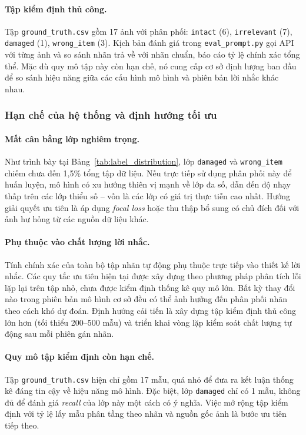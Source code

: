 \paragraph{Tập kiểm định thủ công.}
Tập \texttt{ground\_truth.csv} gồm 17 ảnh với phân phối: \texttt{intact} (6),
\texttt{irrelevant} (7), \texttt{damaged} (1), \texttt{wrong\_item} (3). Kịch bản
đánh giá trong \texttt{eval\_prompt.py} gọi API với từng ảnh và so sánh nhãn trả về
với nhãn chuẩn, báo cáo tỷ lệ chính xác tổng thể. Mặc dù quy mô tập này còn hạn chế,
nó cung cấp cơ sở định lượng ban đầu để so sánh hiệu năng giữa các cấu hình mô hình
và phiên bản lời nhắc khác nhau.



\subsubsection{Hạn chế của hệ thống và định hướng tối ưu}

\paragraph{Mất cân bằng lớp nghiêm trọng.}
Như trình bày tại Bảng~\ref{tab:label_distribution}, lớp \texttt{damaged} và
\texttt{wrong\_item} chiếm chưa đến 1,5\% tổng tập dữ liệu. Nếu trực tiếp sử dụng
phân phối này để huấn luyện, mô hình có xu hướng thiên vị mạnh
về lớp đa số, dẫn đến độ nhạy thấp trên các lớp thiểu số -- vốn là
các lớp có giá trị thực tiễn cao nhất. Hướng giải quyết ưu tiên là áp dụng
\textit{focal loss} hoặc thu thập bổ sung có chủ đích
đối với ảnh hư hỏng từ các nguồn dữ liệu khác.

\paragraph{Phụ thuộc vào chất lượng lời nhắc.}
Tính chính xác của toàn bộ tập nhãn tự động phụ thuộc trực tiếp vào thiết kế lời
nhắc. Các quy tắc ưu tiên hiện tại được xây dựng theo phương pháp phân tích lỗi lặp
lại trên tập nhỏ, chưa được kiểm định thống kê
quy mô lớn. Bất kỳ thay đổi nào trong phiên bản mô hình cơ sở đều có thể ảnh hưởng
đến phân phối nhãn theo cách khó dự đoán. Định hướng cải tiến là xây dựng tập kiểm
định thủ công lớn hơn (tối thiểu 200--500 mẫu) và triển khai vòng lặp kiểm soát
chất lượng tự động sau mỗi phiên gán nhãn.

\paragraph{Quy mô tập kiểm định còn hạn chế.}
Tập \texttt{ground\_truth.csv} hiện chỉ gồm 17 mẫu, quá nhỏ để đưa ra kết luận thống
kê đáng tin cậy về hiệu năng mô hình. Đặc biệt, lớp \texttt{damaged} chỉ có 1 mẫu,
không đủ để đánh giá \textit{recall} của lớp này một cách có ý nghĩa. Việc mở rộng
tập kiểm định với tỷ lệ lấy mẫu phân tầng theo nhãn và
nguồn gốc ảnh là bước ưu tiên tiếp theo.

